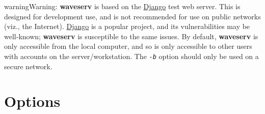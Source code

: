 \documentclass[letterpaper,10pt,english]{sphinxmanual}
\begin{document}
\begin{notice}{warning}{Warning:}
\textbf{waveserv} is based on the \href{http://www.djangoproject.com/}{Django} test web server.  This is designed for development use, and is not recommended for use on public networks (viz., the Internet).  \href{http://www.djangoproject.com/}{Django} is a popular project, and its vulnerabilities may be well-known; \textbf{waveserv} is susceptible to the same issues.  By default, \textbf{waveserv} is only accessible from the local computer, and so is only accessible to other users with accounts on the server/workstation.  The \emph{\texttt{-b}} option should only be used on a secure network.
\end{notice}


\section{Options}
\label{cli:options}

\begin{fulllineitems}
\label{cli:cmdoption-waveserv--version}
\end{fulllineitems}



\begin{fulllineitems}
\label{cli:cmdoption-waveserv-h}
\end{fulllineitems}



\begin{fulllineitems}
\label{cli:cmdoption-waveserv-v}
\end{fulllineitems}



\begin{fulllineitems}
\label{cli:cmdoption-waveserv-b}
\end{fulllineitems}
\end{document}
